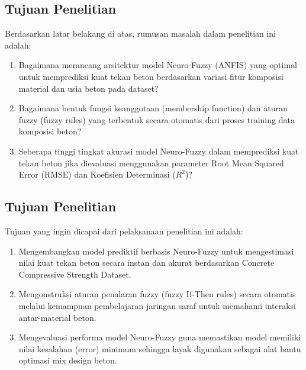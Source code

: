 \subsection{Tujuan Penelitian}
Berdasarkan latar belakang di atas, rumusan masalah dalam penelitian ini adalah:
\begin{enumerate}
    \item Bagaimana merancang arsitektur model Neuro-Fuzzy (ANFIS) yang optimal untuk memprediksi kuat tekan beton berdasarkan variasi fitur komposisi material dan usia beton pada dataset?
    \item Bagaimana bentuk fungsi keanggotaan (membership function) dan aturan fuzzy (fuzzy rules) yang terbentuk secara otomatis dari proses training data komposisi beton?
    \item Seberapa tinggi tingkat akurasi model Neuro-Fuzzy dalam mem\-pre\-dik\-si kuat tekan beton jika dievaluasi menggunakan parameter Root Mean Squared Error (RMSE) dan Koefisien Determinasi ($R^2$)?
\end{enumerate}
\subsection{Tujuan Penelitian}
Tujuan yang ingin dicapai dari pelaksanaan penelitian ini adalah:
\begin{enumerate}
    \item Mengembangkan model prediktif berbasis Neuro-Fuzzy untuk meng\-es\-timasi nilai kuat tekan beton secara instan dan akurat berdasarkan Concrete Compressive Strength Dataset.
    \item Mengonstruksi aturan penalaran fuzzy (fuzzy If-Then rules) se\-ca\-ra o\-to\-ma\-tis melalui kemampuan pembelajaran jaringan saraf untuk memahami interaksi antar-material beton.
    \item Mengevaluasi performa model Neuro-Fuzzy guna memastikan mo\-del me\-mi\-li\-ki nilai kesalahan (error) minimum sehingga layak digunakan sebagai alat bantu optimasi mix design beton.
\end{enumerate}
